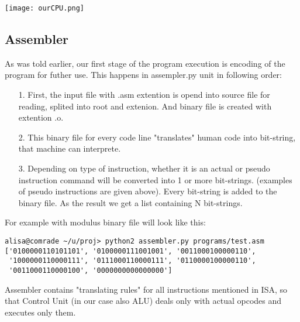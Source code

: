 \documentclass[11pt,a4paper]{article}
\begin{document}
\begin{center}
\texttt{[image: ourCPU.png]}
\end{center}

\newpage
\subsection{Assembler}
As was told earlier, our first stage of the program execution is encoding of the program for futher use. This happens in assempler.py unit in following order:
\begin{enumerate}
	\item[1.] First, the input file with .asm extention is opend into source file for reading, splited into root and extenion. And binary file is created with extention .o.
	\item[2.] This binary file for every code line	"translates" human code into bit-string, that machine can interprete.
	\item[3.] Depending on type of instruction, whether it is an actual or pseudo instruction command will be converted into 1 or more bit-strings. (examples of pseudo instructions are given above). Every bit-string is added to the binary file. As the result we get a list containing N bit-strings.
\end{enumerate}
For example with modulus binary file will look like this:
\begin{verbatim}
alisa@comrade ~/u/proj> python2 assembler.py programs/test.asm
['0100000110101101', '0100000111001001', '0011000100000110',
 '1000000110000111', '0111000110000111', '0110000100000110',
 '0011000110000100', '0000000000000000']
\end{verbatim} 
Assembler contains "translating rules" for all instructions mentioned in ISA, so that Control Unit (in our case also ALU) deals only with actual opcodes and executes only them.\\
\end{document}
